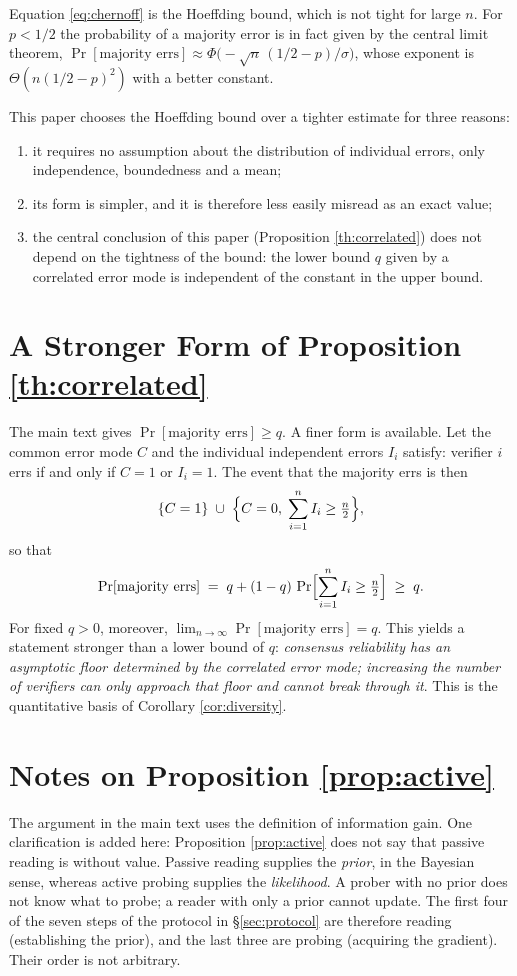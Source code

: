 Equation \eqref{eq:chernoff} is the Hoeffding bound, which is not tight for large $n$. For
$p < 1/2$ the probability of a majority error is in fact given by the central limit
theorem, $\Pr[\text{majority errs}] \approx \Phi\bigl(-\sqrt{n}\,(1/2-p)/\sigma\bigr)$,
whose exponent is $\Theta(n (1/2-p)^{2})$ with a better constant.

This paper chooses the Hoeffding bound over a tighter estimate for three reasons:

\begin{enumerate}[label=(\alph*)]
\item it requires no assumption about the distribution of individual errors, only
      independence, boundedness and a mean;
\item its form is simpler, and it is therefore less easily misread as an exact value;
\item the central conclusion of this paper (Proposition \ref{th:correlated}) does not
      depend on the tightness of the bound: the lower bound $q$ given by a correlated
      error mode is independent of the constant in the upper bound.
\end{enumerate}

\section{A Stronger Form of Proposition \ref{th:correlated}}

The main text gives $\Pr[\text{majority errs}] \ge q$. A finer form is available. Let the
common error mode $C$ and the individual independent errors $I_i$ satisfy: verifier $i$
errs if and only if $C = 1$ or $I_i = 1$. The event that the majority errs is then
\[
\{C = 1\} \;\cup\; \Bigl\{C = 0,\; \sum_{i=1}^{n} I_i \ge \tfrac{n}{2}\Bigr\},
\]
so that
\[
\Pr[\text{majority errs}] \;=\; q + (1-q)\,\Pr\Bigl[\sum_{i=1}^n I_i \ge \tfrac{n}{2}\Bigr]
\;\ge\; q .
\]
For fixed $q > 0$, moreover,
$\lim_{n \to \infty} \Pr[\text{majority errs}] = q$. This yields a statement stronger than
a lower bound of $q$: \emph{consensus reliability has an asymptotic floor determined by
the correlated error mode; increasing the number of verifiers can only approach that
floor and cannot break through it}. This is the quantitative basis of
Corollary \ref{cor:diversity}.

\section{Notes on Proposition \ref{prop:active}}

The argument in the main text uses the definition of information gain. One clarification
is added here: Proposition \ref{prop:active} does not say that passive reading is without
value. Passive reading supplies the \emph{prior}, in the Bayesian sense, whereas active
probing supplies the \emph{likelihood}. A prober with no prior does not know what to
probe; a reader with only a prior cannot update. The first four of the seven steps of the
protocol in \S\ref{sec:protocol} are therefore reading (establishing the prior), and the
last three are probing (acquiring the gradient). Their order is not arbitrary.

